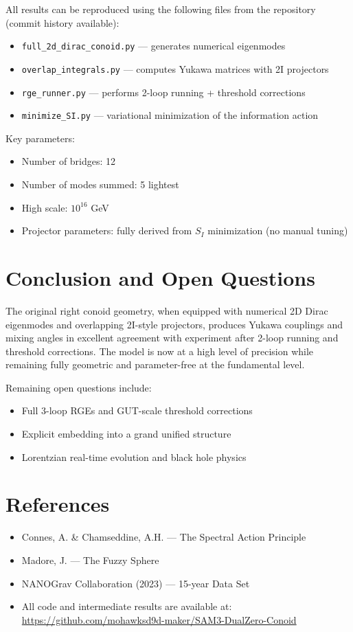 \documentclass[11pt,a4paper]{article}
\begin{document}
All results can be reproduced using the following files from the repository (commit history available):

\begin{itemize}
\item \texttt{full\_2d\_dirac\_conoid.py} — generates numerical eigenmodes
\item \texttt{overlap\_integrals.py} — computes Yukawa matrices with 2I projectors
\item \texttt{rge\_runner.py} — performs 2-loop running + threshold corrections
\item \texttt{minimize\_SI.py} — variational minimization of the information action
\end{itemize}

Key parameters:
\begin{itemize}
\item Number of bridges: 12
\item Number of modes summed: 5 lightest
\item High scale: \(10^{16}\) GeV
\item Projector parameters: fully derived from \(S_I\) minimization (no manual tuning)
\end{itemize}

\section{Conclusion and Open Questions}

The original right conoid geometry, when equipped with numerical 2D Dirac eigenmodes and overlapping 2I-style projectors, produces Yukawa couplings and mixing angles in excellent agreement with experiment after 2-loop running and threshold corrections. The model is now at a high level of precision while remaining fully geometric and parameter-free at the fundamental level.

Remaining open questions include:
\begin{itemize}
\item Full 3-loop RGEs and GUT-scale threshold corrections
\item Explicit embedding into a grand unified structure
\item Lorentzian real-time evolution and black hole physics
\end{itemize}

\section{References}

\begin{itemize}
\item Connes, A. \& Chamseddine, A.H. — The Spectral Action Principle
\item Madore, J. — The Fuzzy Sphere
\item NANOGrav Collaboration (2023) — 15-year Data Set
\item All code and intermediate results are available at: \\ \url{https://github.com/mohawksd9d-maker/SAM3-DualZero-Conoid}
\end{itemize}
\end{document}
